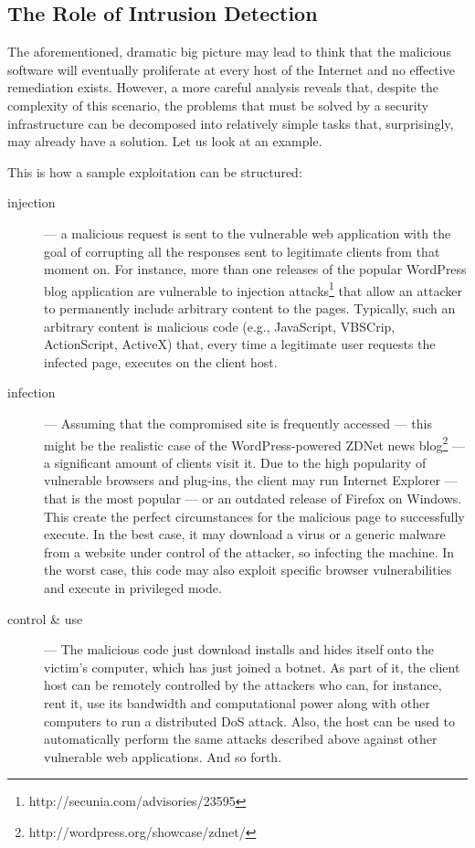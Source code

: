 \subsection{The Role of Intrusion Detection}
\label{introduction:motivation:ids-role}
The aforementioned, dramatic big picture may lead to think that the
malicious software will eventually proliferate at every host of the
Internet and no effective remediation exists. However, a more careful
analysis reveals that, despite the complexity of this scenario, the
problems that must be solved by a security infrastructure can be
decomposed into relatively simple tasks that, surprisingly, may
already have a solution. Let us look at an example.

\begin{example}
  This is how a sample exploitation can be structured:
  \begin{description}
  \item [injection] --- a malicious request is sent to the vulnerable
  web application with the goal of corrupting all the responses sent
  to legitimate clients from that moment on. For instance, more than
  one releases of the popular \textsf{WordPress} blog application are
  vulnerable to injection
  attacks\footnote{http://secunia.com/advisories/23595} that allow an
  attacker to permanently include arbitrary content to the
  pages. Typically, such an arbitrary content is malicious code (e.g.,
  JavaScript, VBSCrip, ActionScript, ActiveX) that, every time a
  legitimate user requests the infected page, executes on the client
  host.
  \item [infection] --- Assuming that the compromised site is
  frequently accessed --- this might be the realistic case of the
  \textsf{WordPress}\hyp{}powered \textsf{ZDNet} news
  blog\footnote{http://wordpress.org/showcase/zdnet/} --- a
  significant amount of clients visit it. Due to the high popularity
  of vulnerable browsers and plug-ins, the client may run
  \textsf{Internet Explorer} --- that is the most popular --- or an
  outdated release of \textsf{Firefox} on \textsf{Windows}. This
  create the perfect circumstances for the malicious page to
  successfully execute. In the best case, it may download a virus or a
  generic malware from a website under control of the attacker, so
  infecting the machine. In the worst case, this code may also exploit
  specific browser vulnerabilities and execute in privileged mode.
  \item [control \& use] --- The malicious code just download installs
  and hides itself onto the victim's computer, which has just joined a
  botnet. As part of it, the client host can be remotely controlled by
  the attackers who can, for instance, rent it, use its bandwidth and
  computational power along with other computers to run a distributed
  \ac{DoS} attack. Also, the host can be used to automatically perform
  the same attacks described above against other vulnerable web
  applications. And so forth.
  \end{description}
\end{example}

